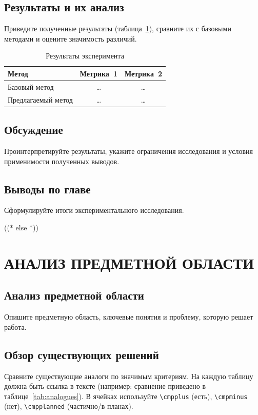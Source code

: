 \documentclass[12pt,a4paper]{extreport}
\begin{document}
\section{Результаты и их анализ}
Приведите полученные результаты (таблица~\ref{tab:results}), сравните их
с базовыми методами и оцените значимость различий.

\begin{table}[H]
\caption{Результаты эксперимента}
\label{tab:results}
\centering
\begin{tabular}{|>{\raggedright\arraybackslash}p{5cm}|c|c|}
\hline
\textbf{Метод} & \textbf{Метрика~1} & \textbf{Метрика~2} \\
\hline
Базовый метод      & \ldots & \ldots \\
\hline
Предлагаемый метод & \ldots & \ldots \\
\hline
\end{tabular}
\end{table}

\section{Обсуждение}
Проинтерпретируйте результаты, укажите ограничения исследования и
условия применимости полученных выводов.

\section{Выводы по главе}
Сформулируйте итоги экспериментального исследования.

\clearpage

((* else *))
\chapter{АНАЛИЗ ПРЕДМЕТНОЙ ОБЛАСТИ}

\section{Анализ предметной области}
Опишите предметную область, ключевые понятия и проблему, которую
решает работа.

\section{Обзор существующих решений}
Сравните существующие аналоги по значимым критериям. На каждую
таблицу должна быть ссылка в тексте (например: сравнение приведено в
таблице~\ref{tab:analogues}). В ячейках используйте \verb|\cmpplus| (есть),
\verb|\cmpminus| (нет), \verb|\cmpplanned| (частично/в планах).
\end{document}
